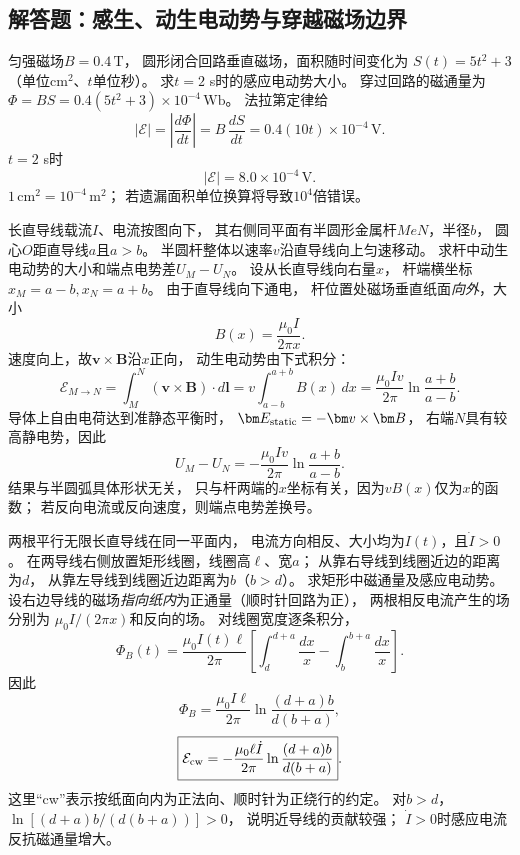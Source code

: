 
\subsection{解答题：感生、动生电动势与穿越磁场边界}

\problemtext 匀强磁场$B=0.4\,\mathrm T$，
圆形闭合回路垂直磁场，面积随时间变化为
$S(t)=5t^2+3$（单位$\mathrm{cm^2}$、$t$单位秒）。
求$t=2$ s时的感应电动势大小。
\workings
穿过回路的磁通量为
$\Phi=BS=0.4(5t^2+3)\times10^{-4}\,\mathrm{Wb}$。
法拉第定律给
\[
|\mathcal E|=\left|\frac{d\Phi}{dt}\right|
=B\,\frac{dS}{dt}
=0.4(10t)\times10^{-4}\,\mathrm V.
\]
$t=2$ s时
\[
\boxed{|\mathcal E|=8.0\times10^{-4}\,\mathrm V}.
\]
\crosscheck $1\,\mathrm{cm^2}=10^{-4}\,\mathrm{m^2}$；
若遗漏面积单位换算将导致$10^4$倍错误。

\problemtext 长直导线载流$I$、电流按图向下，
其右侧同平面有半圆形金属杆$MeN$，半径$b$，
圆心$O$距直导线$a$且$a>b$。
半圆杆整体以速率$v$沿直导线向上匀速移动。
求杆中动生电动势的大小和端点电势差$U_M-U_N$。
\workings
设从长直导线向右量$x$，
杆端横坐标$x_M=a-b,x_N=a+b$。
由于直导线向下通电，
杆位置处磁场垂直纸面\emph{向外}，大小
\[
B(x)=\frac{\mu_0I}{2\pi x}.
\]
速度向上，故$\bm v\times\bm B$沿$x$正向，
动生电动势由下式积分：
\[
\mathcal E_{M\to N}
=\int_M^N(\bm v\times\bm B)\cdot d\bm l
=v\int_{a-b}^{a+b}B(x)\,dx
=\boxed{\frac{\mu_0Iv}{2\pi}
\ln\frac{a+b}{a-b}}.
\]
导体上自由电荷达到准静态平衡时，
$\bm E_{\rm static}=-\bm v\times\bm B$，
右端$N$具有较高静电势，因此
\[
\boxed{U_M-U_N
=-\frac{\mu_0Iv}{2\pi}\ln\frac{a+b}{a-b}}.
\]
\crosscheck 结果与半圆弧具体形状无关，
只与杆两端的$x$坐标有关，因为$vB(x)$仅为$x$的函数；
若反向电流或反向速度，则端点电势差换号。

\problemtext 两根平行无限长直导线在同一平面内，
电流方向相反、大小均为$I(t)$，且$\dot I>0$。
在两导线右侧放置矩形线圈，线圈高$\ell$、宽$a$；
从靠右导线到线圈近边的距离为$d$，
从靠左导线到线圈近边距离为$b$（$b>d$）。
求矩形中磁通量及感应电动势。
\workings
设右边导线的磁场\emph{指向纸内}为正通量（顺时针回路为正），
两根相反电流产生的场分别为
$\mu_0I/(2\pi x)$和反向的场。
对线圈宽度逐条积分，
\[
\Phi_B(t)=\frac{\mu_0I(t)\ell}{2\pi}
\left[
\int_d^{d+a}\frac{dx}{x}
-\int_b^{b+a}\frac{dx}{x}
\right].
\]
因此
\[
\boxed{\Phi_B=
\frac{\mu_0I\ell}{2\pi}
\ln\frac{(d+a)b}{d(b+a)}},
\]
\[
\boxed{\mathcal E_{\rm cw}=
-\frac{\mu_0\ell\dot I}{2\pi}
\ln\frac{(d+a)b}{d(b+a)}}.
\]
这里“cw”表示按纸面向内为正法向、顺时针为正绕行的约定。
\crosscheck 对$b>d$，$\ln[(d+a)b/(d(b+a))]>0$，
说明近导线的贡献较强；
$\dot I>0$时感应电流反抗磁通量增大。

